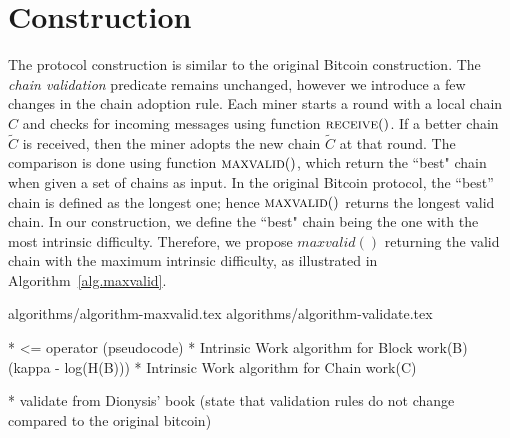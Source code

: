 \section{Construction}
The protocol construction is similar to the original Bitcoin construction.
The \emph{chain validation} predicate remains unchanged, however we introduce
a few changes in the chain adoption rule.
Each miner starts a round with a local chain $C$ and checks for incoming messages
using function $\textsc{receive}()$. If a better chain $\widetilde{C}$ is received, then the
miner adopts the new chain $\widetilde{C}$ at that round. The comparison is done using
function $\textsc{maxvalid}()$, which return the ``best" chain
when given a set of chains as input. In the original Bitcoin protocol, the
``best'' chain is defined as the longest one; hence $\textsc{maxvalid}()$ returns
the longest valid chain. In our construction, we define the ``best" chain being
the one with the most intrinsic difficulty.
Therefore, we propose $maxvalid()$ returning the valid chain
with the maximum intrinsic difficulty, as illustrated in Algorithm~\ref{alg.maxvalid}.

{algorithms/algorithm-maxvalid.tex}
{algorithms/algorithm-validate.tex}

* <= operator (pseudocode)
* Intrinsic Work algorithm for Block work(B) (kappa - log(H(B)))
* Intrinsic Work algorithm for Chain work(C)

* validate from Dionysis' book (state that validation rules do not change compared to the original bitcoin)
